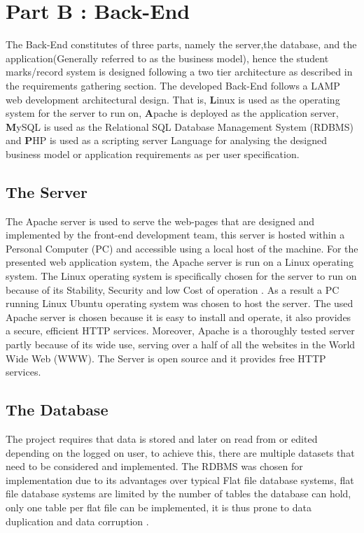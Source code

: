 

\section{Part B : Back-End}  
The Back-End constitutes of three parts, namely the server,the database, and the application(Generally referred to as the business model), hence the  student marks/record system is designed following a two tier architecture as described in the requirements gathering section. The developed Back-End follows a LAMP web development architectural design. That is, \textbf{L}inux is used as the operating system for the server to run on, \textbf{A}pache is deployed as the application server, \textbf{M}ySQL is used as the Relational SQL Database Management System (RDBMS) and \textbf{P}HP is used as a scripting server Language for analysing the designed business model or application requirements as per user specification.     

\subsection{The Server}
The Apache server is used to serve the web-pages that are designed and implemented by the front-end development team, this server is hosted within a Personal Computer (PC) and accessible using a local host of the machine. For the presented web application system, the Apache server is run on a Linux operating system. The Linux operating system is specifically chosen for the server to run on because of its Stability, Security and low Cost of operation \cite{ref1}. As a result a PC running Linux Ubuntu operating system was chosen to host the server. The used Apache server is chosen because it is easy to install and operate, it also provides a secure, efficient HTTP services. Moreover, Apache is a thoroughly tested server partly because of its wide use, serving over a half of all the websites in the World Wide Web (WWW). The Server is open source and it provides free HTTP services.  

\subsection{The Database} 

The project requires that data is stored and later on read from or edited depending on the logged on user, to achieve this, there are multiple datasets that need to be considered and implemented. 
The RDBMS was chosen for implementation due to its advantages over typical Flat file database systems, flat file database systems are limited by the number of tables the database can hold, only one table per flat file can be implemented, it is thus prone to data duplication and data corruption \cite{ref10, ref11}. 

